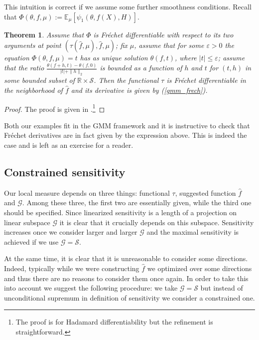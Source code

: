 \documentclass[12pt]{article}
\theoremstyle{plain}
\newtheorem{theorem}{Theorem}[section]
\begin{document}
This intuition is correct if we assume some further smoothness conditions. Recall that  $\Phi(\theta, f, \mu):=  \mathbb{E}_{\mu}[\psi_1(\theta, f(X), H)]$.
\begin{theorem}
Assume  that $\Phi$ is Fr\' echet differentiable with respect to its two arguments at point $(\tau(\hat f, \mu),\hat f,\mu)$;  fix $\mu$, assume that for some $\varepsilon>0$ the equation $\Phi(\theta,f,\mu) = t$ has as unique solution $\theta(f,t)$, where $|t|\le \varepsilon$;  assume that the ratio $\frac{\theta(f+h,t)-\theta(f,0)}{|t|+\|h\|_2}$ is bounded as a function of $h$ and $t$ for $(t,h)$ in some bounded subset of $\mathbb{R}\times \mathcal{S}$. Then the functional $\tau$ is Fr\'echet differentiable in the neighborhood of $\hat f$ and its derivative is given by (\ref{gmm_frech}).
\end{theorem}
\begin{proof}
The proof is given in \parencite[][page 22, theorem 3.2.4]{fernholz2012mises}.\footnote{The proof is for Hadamard differentiability but the refinement is straightforward.}
\end{proof}

Both our examples fit in the GMM framework and it is instructive to check that Fr\'echet derivatives are in fact given by the expression above. This is indeed the case and is left as an exercise for a reader. 

\subsection{Constrained sensitivity} 

Our local measure depends on three things: functional $\tau$, suggested function $\hat f$ and $\mathcal{G}$. Among these three, the first two are essentially given, while the third one should be specified. Since linearized sensitivity is a length of a projection on linear subspace $\mathcal{G}$ it is clear that it crucially depends on this subspace. Sensitivity increases once we consider larger and larger $\mathcal{G}$ and the maximal sensitivity is achieved if we use $\mathcal{G} = \mathcal{S}$.

At the same time, it is clear that it is unreasonable to consider some directions. Indeed, typically while we were constructing $\hat f$ we optimized over some directions and thus there are no reasons to consider them once again. In order to take this into account we suggest the following procedure: we take $\mathcal{G} = \mathcal{S}$ but instead of unconditional supremum in definition of sensitivity we consider a constrained one.
\end{document}
